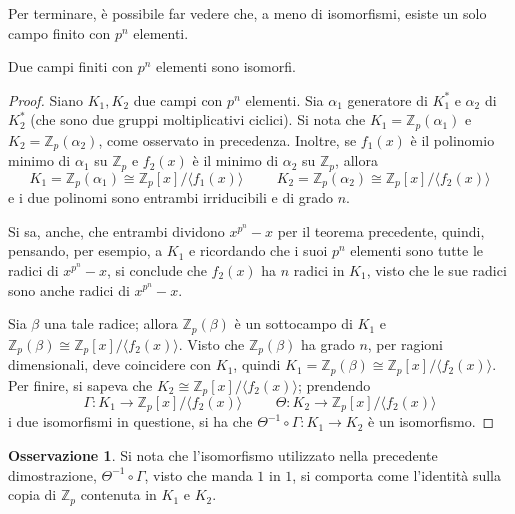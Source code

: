 \documentclass[11pt, a4paper]{scrartcl}
\theoremstyle{definition}
\numberwithin{esempio}{section}
\theoremstyle{definition}
\newtheorem{obs}{Osservazione}
\numberwithin{obs}{section}
\numberwithin{nota}{section}
\numberwithin{equation}{subsection}
\begin{document}
\noindent Per terminare, \`e possibile far vedere che, a meno di isomorfismi, esiste un solo campo finito con $p^n$ elementi.
\begin{teorema}
	{}{}
	Due campi finiti con $p^n$ elementi sono isomorfi.
	\begin{proof}
		Siano $K_1,K_2$ due campi con $p^n$ elementi.
		Sia $\alpha _1$ generatore di $K_1^*$ e $\alpha _2$ di $K_2^*$ (che sono due gruppi moltiplicativi ciclici).
		Si nota che $K_1=\mathbb{Z}_p(\alpha _1)$ e $K_2 = \mathbb{Z}_p(\alpha _2)$, come osservato in precedenza.
		Inoltre, se $f_1(x)$ \`e il polinomio minimo di $\alpha _1$ su $\mathbb{Z}_p$ e $f_2(x)$ \`e il minimo di $\alpha _2$ su $\mathbb{Z}_p$, allora
		\[
			K_1=\mathbb{Z}_p(\alpha _1) \cong \mathbb{Z}_p[x] / \langle f_1(x) \rangle \hspace{1cm}K_2 = \mathbb{Z}_p(\alpha _2) \cong \mathbb{Z}_p[x] / \langle f_2(x) \rangle
		\] 
		e i due polinomi sono entrambi irriducibili e di grado $n$.

		Si sa, anche, che entrambi dividono $x^{p^n} -x$ per il teorema precedente, quindi, pensando, per esempio, a $K_1$ e ricordando che i suoi $p^n$ elementi sono tutte le radici di $x^{p^n} -x$, si conclude che $f_2(x)$ ha $n$ radici in $K_1$, visto che le sue radici sono anche radici di $x^{p^n} -x$.

		Sia $\beta $ una tale radice; allora $\mathbb{Z}_p(\beta )$ \`e un sottocampo di $K_1$ e $\mathbb{Z}_p(\beta )\cong \mathbb{Z}_p[x] /\langle f_2(x) \rangle$.
		Visto che $\mathbb{Z}_p(\beta )$ ha grado $n$, per ragioni dimensionali, deve coincidere con $K_1$, quindi $K_1 = \mathbb{Z}_p(\beta ) \cong \mathbb{Z}_p[x] / \langle f_2(x) \rangle$.
		Per finire, si sapeva che $K_2\cong \mathbb{Z}_p[x] / \langle f_2(x) \rangle$; prendendo 
		\[
			\Gamma:K_1\to \mathbb{Z}_p[x] / \langle f_2(x) \rangle\hspace{1cm}\Theta :K_2 \to \mathbb{Z}_p [x] / \langle f_2(x) \rangle
		\] 
		i due isomorfismi in questione, si ha che $\Theta^{-1} \circ \Gamma:K_1\to K_2$ \`e un isomorfismo.
	\end{proof}
\end{teorema}
\begin{obs}
	Si nota che l'isomorfismo utilizzato nella precedente dimostrazione, $\Theta^{-1} \circ \Gamma$, visto che manda $1$ in $1$, si comporta come l'identit\`a sulla copia di $\mathbb{Z}_p$ contenuta in $K_1$ e $K_2$.
\end{obs}
\end{document}
